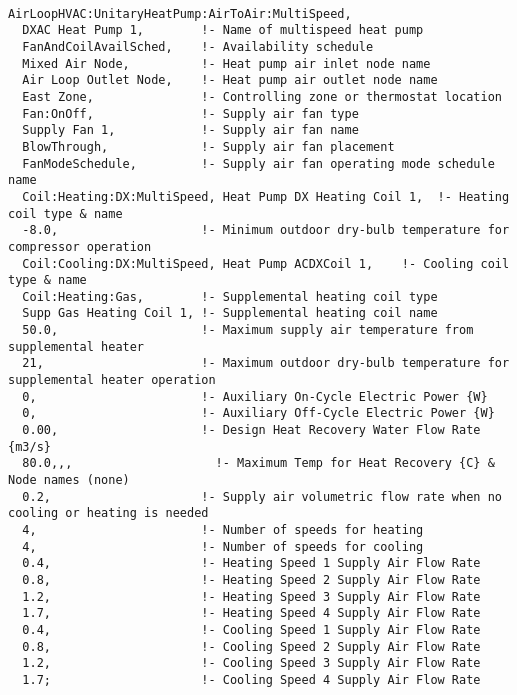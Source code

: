 \begin{lstlisting}

AirLoopHVAC:UnitaryHeatPump:AirToAir:MultiSpeed,
  DXAC Heat Pump 1,        !- Name of multispeed heat pump
  FanAndCoilAvailSched,    !- Availability schedule
  Mixed Air Node,          !- Heat pump air inlet node name
  Air Loop Outlet Node,    !- Heat pump air outlet node name
  East Zone,               !- Controlling zone or thermostat location
  Fan:OnOff,               !- Supply air fan type
  Supply Fan 1,            !- Supply air fan name
  BlowThrough,             !- Supply air fan placement
  FanModeSchedule,         !- Supply air fan operating mode schedule name
  Coil:Heating:DX:MultiSpeed, Heat Pump DX Heating Coil 1,  !- Heating coil type & name
  -8.0,                    !- Minimum outdoor dry-bulb temperature for compressor operation
  Coil:Cooling:DX:MultiSpeed, Heat Pump ACDXCoil 1,    !- Cooling coil type & name
  Coil:Heating:Gas,        !- Supplemental heating coil type
  Supp Gas Heating Coil 1, !- Supplemental heating coil name
  50.0,                    !- Maximum supply air temperature from supplemental heater
  21,                      !- Maximum outdoor dry-bulb temperature for supplemental heater operation
  0,                       !- Auxiliary On-Cycle Electric Power {W}
  0,                       !- Auxiliary Off-Cycle Electric Power {W}
  0.00,                    !- Design Heat Recovery Water Flow Rate {m3/s}
  80.0,,,                    !- Maximum Temp for Heat Recovery {C} & Node names (none)
  0.2,                     !- Supply air volumetric flow rate when no cooling or heating is needed
  4,                       !- Number of speeds for heating
  4,                       !- Number of speeds for cooling
  0.4,                     !- Heating Speed 1 Supply Air Flow Rate
  0.8,                     !- Heating Speed 2 Supply Air Flow Rate
  1.2,                     !- Heating Speed 3 Supply Air Flow Rate
  1.7,                     !- Heating Speed 4 Supply Air Flow Rate
  0.4,                     !- Cooling Speed 1 Supply Air Flow Rate
  0.8,                     !- Cooling Speed 2 Supply Air Flow Rate
  1.2,                     !- Cooling Speed 3 Supply Air Flow Rate
  1.7;                     !- Cooling Speed 4 Supply Air Flow Rate


\end{lstlisting}
